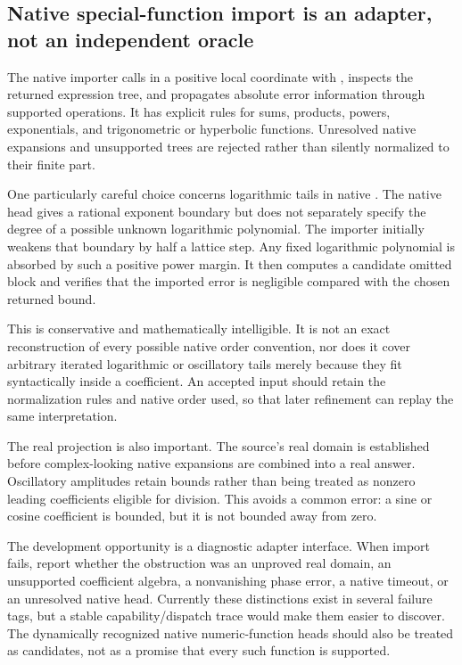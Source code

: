 \documentclass[11pt,a4paper]{article}
\newcommand{\code}[1]{\texttt{\detokenize{#1}}}
\theoremstyle{definition}
\begin{document}
\subsection{Native special-function import is an adapter, not an independent oracle}

The native importer calls \code{Series} in a positive local coordinate with \code{Analytic -> False}, inspects the returned expression tree, and propagates absolute error information through supported operations. It has explicit rules for sums, products, powers, exponentials, and trigonometric or hyperbolic functions. Unresolved native expansions and unsupported trees are rejected rather than silently normalized to their finite part.\cite{native}

One particularly careful choice concerns logarithmic tails in native \code{SeriesData}. The native head gives a rational exponent boundary but does not separately specify the degree of a possible unknown logarithmic polynomial. The importer initially weakens that boundary by half a lattice step. Any fixed logarithmic polynomial is absorbed by such a positive power margin. It then computes a candidate omitted block and verifies that the imported error is negligible compared with the chosen returned bound.\cite{native}

This is conservative and mathematically intelligible. It is not an exact reconstruction of every possible native order convention, nor does it cover arbitrary iterated logarithmic or oscillatory tails merely because they fit syntactically inside a coefficient. An accepted input should retain the normalization rules and native order used, so that later refinement can replay the same interpretation.

The real projection is also important. The source's real domain is established before complex-looking native expansions are combined into a real answer. Oscillatory amplitudes retain bounds rather than being treated as nonzero leading coefficients eligible for division. This avoids a common error: a sine or cosine coefficient is bounded, but it is not bounded away from zero.

The development opportunity is a diagnostic adapter interface. When import fails, report whether the obstruction was an unproved real domain, an unsupported coefficient algebra, a nonvanishing phase error, a native timeout, or an unresolved native head. Currently these distinctions exist in several failure tags, but a stable capability/dispatch trace would make them easier to discover. The dynamically recognized native numeric-function heads should also be treated as candidates, not as a promise that every such function is supported.\cite{native}
\end{document}
